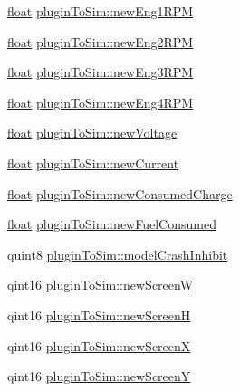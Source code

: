\begin{DoxyCompactItemize}
\hyperlink{_super_l_u_support_8h_a6a1bb6ed41f44b60e7bd83b0e9945aa7}{float} \hyperlink{group___aero_sim_r_c_ga8e41974881d85220a22aa7b1e10a6c8b}{plugin\-To\-Sim\-::new\-Eng1\-R\-P\-M}
\item 
\hyperlink{_super_l_u_support_8h_a6a1bb6ed41f44b60e7bd83b0e9945aa7}{float} \hyperlink{group___aero_sim_r_c_gaf9f1bbadaada97aec5a72a47799dbb69}{plugin\-To\-Sim\-::new\-Eng2\-R\-P\-M}
\item 
\hyperlink{_super_l_u_support_8h_a6a1bb6ed41f44b60e7bd83b0e9945aa7}{float} \hyperlink{group___aero_sim_r_c_ga1c7f49c14ce7325e93375b1973f36b91}{plugin\-To\-Sim\-::new\-Eng3\-R\-P\-M}
\item 
\hyperlink{_super_l_u_support_8h_a6a1bb6ed41f44b60e7bd83b0e9945aa7}{float} \hyperlink{group___aero_sim_r_c_ga474540a6a0a35ece5e87974e07c99c87}{plugin\-To\-Sim\-::new\-Eng4\-R\-P\-M}
\item 
\hyperlink{_super_l_u_support_8h_a6a1bb6ed41f44b60e7bd83b0e9945aa7}{float} \hyperlink{group___aero_sim_r_c_ga6a11d71df14bc0a5867c993a47da8f0f}{plugin\-To\-Sim\-::new\-Voltage}
\item 
\hyperlink{_super_l_u_support_8h_a6a1bb6ed41f44b60e7bd83b0e9945aa7}{float} \hyperlink{group___aero_sim_r_c_ga7fd515830d601c3785dadd02ed64dcc0}{plugin\-To\-Sim\-::new\-Current}
\item 
\hyperlink{_super_l_u_support_8h_a6a1bb6ed41f44b60e7bd83b0e9945aa7}{float} \hyperlink{group___aero_sim_r_c_gabb6455cde42e82e713838307779ab4f7}{plugin\-To\-Sim\-::new\-Consumed\-Charge}
\item 
\hyperlink{_super_l_u_support_8h_a6a1bb6ed41f44b60e7bd83b0e9945aa7}{float} \hyperlink{group___aero_sim_r_c_ga8a8341d7559a5dfa620a7c486f2dc023}{plugin\-To\-Sim\-::new\-Fuel\-Consumed}
\item 
quint8 \hyperlink{group___aero_sim_r_c_gac766c17be7565d11f169ec43dac2113d}{plugin\-To\-Sim\-::model\-Crash\-Inhibit}
\item 
qint16 \hyperlink{group___aero_sim_r_c_ga73893f1a06af3481486ee34ef91001c0}{plugin\-To\-Sim\-::new\-Screen\-W}
\item 
qint16 \hyperlink{group___aero_sim_r_c_ga6ac6931958ba1a74ff06dbfe7dba5676}{plugin\-To\-Sim\-::new\-Screen\-H}
\item 
qint16 \hyperlink{group___aero_sim_r_c_gacb23e684331322adcce5771dc717ea18}{plugin\-To\-Sim\-::new\-Screen\-X}
\item 
qint16 \hyperlink{group___aero_sim_r_c_gad5aa10f7542e0fcf3d4ac3981efc93a2}{plugin\-To\-Sim\-::new\-Screen\-Y}
\item 

\end{DoxyCompactItemize}
